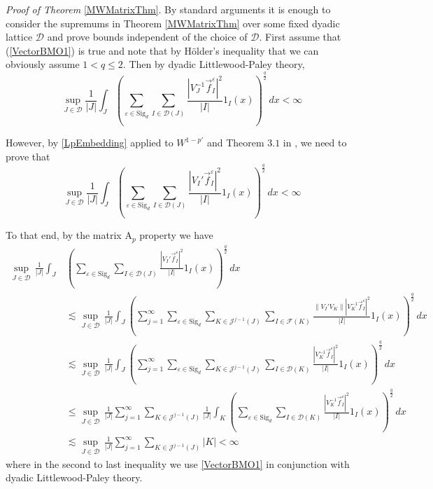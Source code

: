\documentclass[12pt,reqno ]{amsart}
\numberwithin{equation}{section}
\theoremstyle{definition}
\newcommand{\D}{\ensuremath{\mathscr{D}}}
\newcommand{\J}{\ensuremath{\mathscr{J}}}
\newcommand{\F}{\ensuremath{\mathscr{F}}}
\renewcommand{\S}{\ensuremath{\text{Sig}_d}}
\begin{document}
\noindent \textit{Proof of Theorem} \ref{MWMatrixThm}. By standard arguments it is enough to consider the supremums in Theorem \ref{MWMatrixThm} over some fixed dyadic lattice $\D$ and prove bounds independent of the choice of $\D$.   First assume that (\ref{VectorBMO1}) is true and note that by H\"{o}lder's inequality that we can obviously assume $1 < q \leq 2$.  Then by dyadic Littlewood-Paley theory, \begin{equation*} \sup_{J \in \D} \frac{1}{|J|} \int_J \left(\sum_{\varepsilon \in \S} \sum_{I \in \D(J)} \frac{| V_J ^{-1}  \vec{f}_I ^\varepsilon |^2}{|I|} 1_I(x) \right)^\frac{q}{2} \, dx < \infty   \end{equation*}

However, by \eqref{LpEmbedding} applied to $W^{1 - p'}$ and Theorem $3.1$ in \cites{NTV}, we need to prove that \begin{equation*} \sup_{J \in \D} \frac{1}{|J|} \int_J \left(\sum_{\varepsilon \in \S} \sum_{I \in \D(J)} \frac{| V_I '  \vec{f}_I ^\varepsilon|^2}{|I|} 1_I(x) \right)^\frac{q}{2} \, dx  < \infty \end{equation*}

To that end, by the matrix A${}_p$ property we have \begin{align*}  \sup_{J \in \D} \, \frac{1}{|J|} \int_J & \left(\sum_{\varepsilon \in \S} \sum_{I \in \D(J)} \frac{| V_I '  \vec{f}_I ^\varepsilon |^2}{|I|} 1_I(x) \right)^\frac{q}{2} \, dx \\ & \lesssim \sup_{J \in \D} \,  \frac{1}{|J|}  \int_J \left(\sum_{j = 1}^\infty \sum_{\varepsilon \in \S} \sum_{K \in \J^{j - 1}(J)} \sum_{I \in \F(K) } \frac{\| V_I'  V_K   \|   | V_K ^{-1} \vec{f}_I ^\varepsilon|^2}{|I|} 1_I(x) \right)^\frac{q}{2} \, dx \\ &  \lesssim  \sup_{J \in \D} \,  \frac{1}{|J|}  \int_J \left(\sum_{j = 1}^\infty \sum_{\varepsilon \in \S} \sum_{K \in \J^{j - 1}(J)} \sum_{I \in \D(K) } \frac{| V_K ^{-1} \vec{f}_I ^\varepsilon |^2}{|I|} 1_I(x) \right)^\frac{q}{2} \, dx \\ & \leq  \sup_{J \in \D} \,  \frac{1}{|J|}  \sum_{j = 1}^\infty \sum_{K \in \J^{j - 1}(J)} \frac{1}{|J|} \int_K \left( \sum_{\varepsilon \in \S} \sum_{I \in \D(K) } \frac{| V_K ^{-1} \vec{f}_I ^\varepsilon|^2}{|I|} 1_I(x) \right)^\frac{q}{2} \, dx \\ & \lesssim  \sup_{J \in \D} \,  \frac{1}{|J|}  \sum_{j = 1}^\infty \sum_{K \in \J^{j - 1}(J)} |K|  < \infty \end{align*} where in the second to last inequality we use \eqref{VectorBMO1} in conjunction with dyadic Littlewood-Paley theory.
\end{document}
